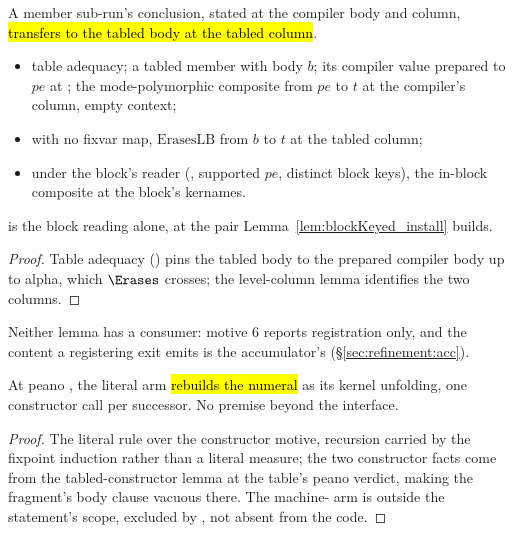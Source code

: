 \begin{lemma}
\label{lem:visitMutual_member_erases}
\leanok
{}
 A member sub-run's conclusion, stated at the compiler body and column, \hl{transfers to
the tabled body at the tabled column}.
\begin{itemize}
\item {} table adequacy; a tabled member with body $b$; its compiler value prepared to $pe$ at
; the mode-polymorphic composite from $pe$ to $t$ at the compiler's column, empty
context;
\item {} with no fixvar map, $\mathrm{ErasesLB}$ from $b$ to $t$ at the tabled column;
\item under the block's reader (, supported $pe$, distinct block keys), the in-block
composite  at the block's kernames.
\end{itemize}
  is the block reading alone, at the pair
Lemma~\ref{lem:blockKeyed_install} builds.
\end{lemma}
\begin{proof}
\leanok
{}
 Table adequacy () pins the tabled body to the prepared compiler body up
to alpha, which $\Erases$ crosses; the level-column lemma identifies the two columns.
\end{proof}

\begin{remark}
 Neither lemma has a consumer: motive 6 reports registration only, and the content a
registering exit emits is the accumulator's (\S\ref{sec:refinement:acc}).
\end{remark}

\begin{lemma}
\label{lem:step_visitLiteral}
\leanok
{}
 At peano , the literal arm \hl{rebuilds the numeral} as its kernel unfolding,
one constructor call per successor. No premise beyond the interface.
\end{lemma}
\begin{proof}
\leanok
{}
 The literal rule over the constructor motive, recursion carried by the fixpoint induction
rather than a literal measure; the two constructor facts come from the tabled-constructor lemma at the
table's peano verdict, making the fragment's body clause vacuous there. The machine- arm is
outside the statement's scope, excluded by , not absent from the code.
\end{proof}

